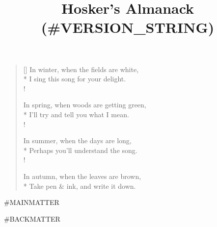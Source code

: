 \documentclass{amsbook}
\title{Hosker's Almanack (#VERSION_STRING)}
\begin{document}
\frontmatter

\maketitle

\settowidth{\versewidth}{In winter, when the fields are white,}
\begin{verse}[\versewidth]
    In winter, when the fields are white,\\*
    I sing this song for your delight.\\!

    In spring, when woods are getting green,\\*
    I'll try and tell you what I mean.\\!

    In summer, when the days are long,\\*
    Perhaps you'll understand the song.\\!

    In autumn, when the leaves are brown,\\*
    Take pen \& ink, and write it down.
\end{verse}

\tableofcontents


\renewcommand\chaptername{Month}

\mainmatter

\renewcommand\thechapter{\Roman{chapter}}
\renewcommand\thesection{\arabic{section}}
\renewcommand\thesubsection{\thesection.\alph{subsection}}
\renewcommand\thefootnote{{\thesubsection}.}
\makeatletter
    \def\blfootnote{\xdef\@thefnmark{}\@footnotetext}
    \renewcommand{\@makefnmark}{\hbox{{{{\@thefnmark}}}}\hbox{{{{ }}}}}
    \renewcommand\@makefntext[1]{\hspace*{1em}{\@thefnmark} #1}
\makeatother

#MAINMATTER


\renewcommand\thesection{\arabic{section}}
\renewcommand\thefootnote{\arabic{footnote}}
\makeatletter
    \renewcommand{\@makefnmark}{\textsuperscript{\@thefnmark}}
    \renewcommand\@makefntext[1]{\hspace*{1em}\textsuperscript{\@thefnmark}#1}
\makeatother

#BACKMATTER

\printbibliography[title={Sources}]
\end{document}
